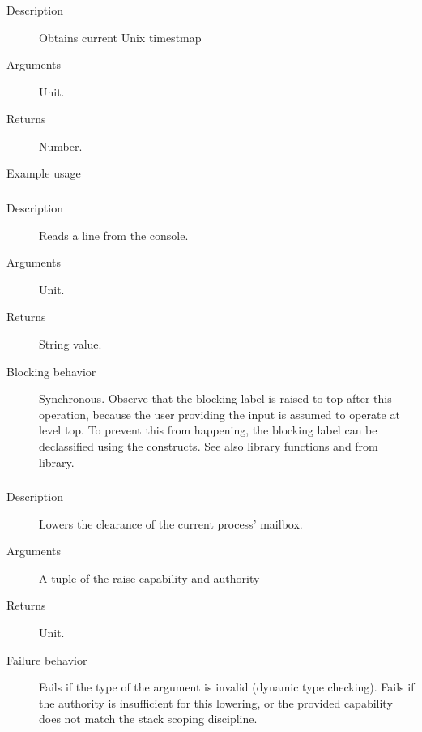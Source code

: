 \subsubsection{}
\begin{description}
    \item [Description] Obtains current Unix timestmap
    \item [Arguments] Unit.
    \item [Returns] Number.
    \item [Example usage] 
\end{description}


\subsubsection{}
\begin{description}
\item[Description] Reads a  line from the console.
\item[Arguments] Unit.
\item[Returns] String value.
\item[Blocking behavior] Synchronous. Observe that the blocking label
is raised to top after this operation, because the user providing the
input is assumed to operate at level top. To prevent this from happening,
the blocking label can be declassified using the  constructs.
See also library functions  and 
from  library.
\end{description}


\subsubsection{}
\begin{description}
    \item [Description] Lowers the clearance of the current process' mailbox.
    \item [Arguments] A tuple of the raise capability and authority
    \item [Returns] Unit.
    \item [Failure behavior] Fails if the type of the argument is invalid (dynamic type checking). Fails if the authority is insufficient for this lowering, or the provided capability does not match the stack scoping discipline.
\end{description}


